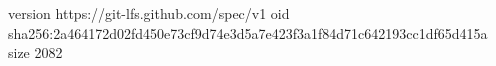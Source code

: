 version https://git-lfs.github.com/spec/v1
oid sha256:2a464172d02fd450e73cf9d74e3d5a7e423f3a1f84d71c642193cc1df65d415a
size 2082
